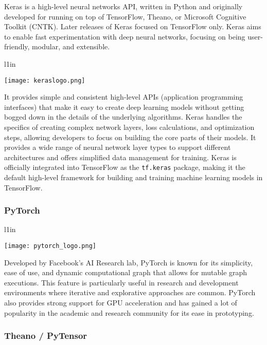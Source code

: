 Keras is a high-level neural networks API, written in Python and originally developed for running on top of TensorFlow, Theano, or Microsoft Cognitive Toolkit (CNTK). Later releases of Keras focused on TensorFlow only. Keras aims to enable fast experimentation with deep neural networks, focusing on being user-friendly, modular, and extensible. \begin{wrapfigure}{l}{1in}
\begin{center}
\texttt{[image: keraslogo.png]}
\end{center}
\end{wrapfigure}
It provides simple and consistent high-level APIs (application programming interfaces) that make it easy to create deep learning models without getting bogged down in the details of the underlying algorithms. Keras handles the specifics of creating complex network layers, loss calculations, and optimization steps, allowing developers to focus on building the core parts of their models. It provides a wide range of neural network layer types to support different architectures and offers simplified data management for training. Keras is officially integrated into TensorFlow as the \texttt{tf.keras} package, making it the default high-level framework for building and training machine learning models in TensorFlow.

\subsubsection*{PyTorch}

\begin{wrapfigure}{l}{1in}
\begin{center}
\texttt{[image: pytorch\_logo.png]}
\end{center}
\end{wrapfigure}
Developed by Facebook's AI Research lab, PyTorch is known for its simplicity, ease of use, and dynamic computational graph that allows for mutable graph executions. This feature is particularly useful in research and development environments where iterative and explorative approaches are common. PyTorch also provides strong support for GPU acceleration and has gained a lot of popularity in the academic and research community for its ease in prototyping.

\subsubsection*{Theano / PyTensor}

